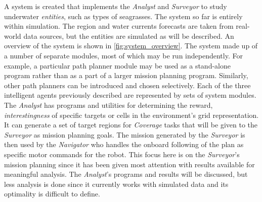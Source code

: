 \documentclass{tamuccthesis}
\begin{document}
A system is created that implements the \textit{Analyst} and \textit{Surveyor} to study underwater \textit{entities}, such as types of seagrasses. The system so far is entirely within simulation. The region and water currents forecasts are taken from real-world data sources, but the entities are simulated as will be described. An overview of the system is shown in \ref{fig:system_overview}. The system made up of a number of separate modules, most of which may be run independently. For example, a particular path planner module may be used as a stand-alone program rather than as a part of a larger mission planning program. Similarly, other path planners can be introduced and chosen selectively. Each of the three intelligent agents previously described are represented by sets of system modules. The \textit{Analyst} has programs and utilities for determining the reward, \textit{interestingness} of specific targets or cells in the environment's grid representation. It can generate a set of target regions for \textit{Coverage} tasks that will be given to the \textit{Surveyor} as mission planning goals. The mission generated by the \textit{Surveyor} is then used by the \textit{Navigator} who handles the onboard following of the plan as specific motor commands for the robot. This focus here is on the \textit{Surveyor}'s mission planning since it has been given most attention with results available for meaningful analysis. The \textit{Analyst}'s programs and results will be discussed, but less analysis is done since it currently works with simulated data and its optimality is difficult to define.
\end{document}
